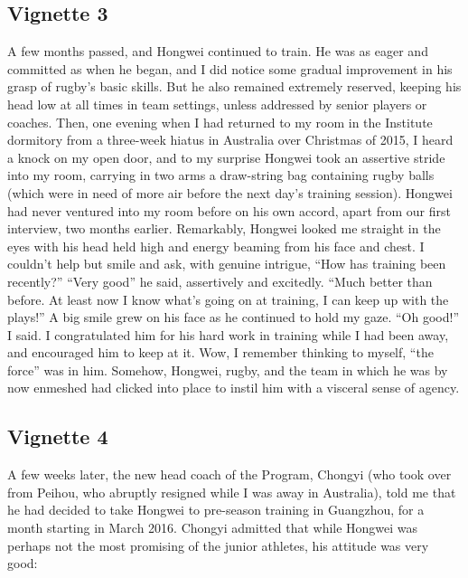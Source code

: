 \subsection{Vignette 3}
A few months passed, and Hongwei continued to train. He was as eager and committed as when he began, and I did notice some gradual improvement in his grasp of rugby's basic skills.  But he also remained extremely reserved, keeping his head low at all times in team settings, unless addressed by senior players or coaches.  Then, one evening when I had returned to my room in the Institute dormitory from a three-week hiatus in Australia over Christmas of 2015, I heard a knock on my open door, and to my surprise Hongwei took an assertive stride into my room, carrying in two arms a draw-string bag containing rugby balls (which were in need of more air before the next day's training session).  Hongwei had never ventured into my room before on his own accord, apart from our first interview, two months earlier.  Remarkably, Hongwei looked me straight in the eyes with his head held high and energy beaming from his face and chest. I couldn't help but smile and ask, with genuine intrigue, ``How has training been recently?''
``Very good'' he said, assertively and excitedly.  ``Much better than before.  At least now I know what’s going on at training, I can keep up with the plays!''  A big smile grew on his face as he continued to hold my gaze.  ``Oh good!'' I said. I congratulated him for his hard work in training while I had been away, and encouraged him to keep at it. Wow, I remember thinking to myself, ``the force'' was in him.  Somehow, Hongwei, rugby, and the team in which he was by now enmeshed had clicked into place to instil him with a visceral sense of agency.

\subsection{Vignette 4}
A few weeks later, the new head coach of the Program, Chongyi (who took over from Peihou, who abruptly resigned while I was away in Australia), told me that he had decided to take Hongwei to pre-season training in Guangzhou, for a month starting in March 2016.  Chongyi admitted that while Hongwei was perhaps not the most promising of the junior athletes, his attitude was very good:

